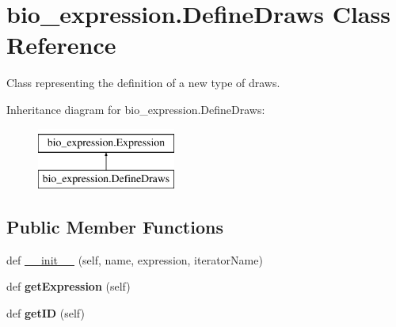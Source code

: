 \hypertarget{classbio__expression_1_1_define_draws}{}\section{bio\+\_\+expression.\+Define\+Draws Class Reference}
\label{classbio__expression_1_1_define_draws}


Class representing the definition of a new type of draws.  


Inheritance diagram for bio\+\_\+expression.\+Define\+Draws\+:\begin{figure}[H]
\begin{center}
\leavevmode
\includegraphics[height=2.000000cm]{classbio__expression_1_1_define_draws}
\end{center}
\end{figure}
\subsection*{Public Member Functions}
\begin{DoxyCompactItemize}
\item 
def \hyperlink{classbio__expression_1_1_define_draws_ab0a4b4e1732548fc8bee727d16286110}{\+\_\+\+\_\+init\+\_\+\+\_\+} (self, name, expression, iterator\+Name)
\item 
def {\bfseries get\+Expression} (self)\hypertarget{classbio__expression_1_1_define_draws_a8df96051a7d9d2b50e0ac690d343147e}{}\label{classbio__expression_1_1_define_draws_a8df96051a7d9d2b50e0ac690d343147e}

\item 
def {\bfseries get\+ID} (self)\hypertarget{classbio__expression_1_1_define_draws_aa35c6a09cc300b1cc5b2f51899a6fcb9}{}\label{classbio__expression_1_1_define_draws_aa35c6a09cc300b1cc5b2f51899a6fcb9}

\end{DoxyCompactItemize}
